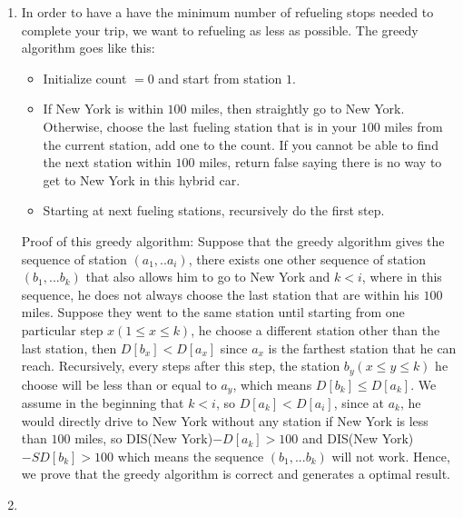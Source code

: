 \documentclass[11pt]{article}
\begin{document}
\begin{solution}
$$  $$
\begin{enumerate}
    \item  
       In order to have a have the minimum number of refueling stops needed to complete your trip, we want to refueling as less as possible. The greedy algorithm goes like this:
       \begin{itemize}
           \item Initialize count $= 0$ and start from station $1$.
           \item If New York is within $100$ miles, then straightly go to New York. Otherwise, choose the last fueling station that is in your $100$ miles from the current station, add one to the count. If you cannot be able to find the next station within $100$ miles, return false saying there is no way to get to New York in this hybrid car.
           \item Starting at next fueling stations, recursively do the first step.
       \end{itemize}
       Proof of this greedy algorithm: Suppose that the greedy algorithm gives the sequence of station $(a_1,..a_i)$, there exists one other sequence of station $(b_1,...b_k)$ that also allows him to go to New York and $k<i$, where in this sequence, he does not always choose the last station that are within his $100$ miles. Suppose they went to the same station until starting from one particular step $x(1\leq x\leq k)$, he choose a different station other than the last station, then $D[b_x] < D[a_x]$ since $a_x$ is the farthest station that he can reach. Recursively, every steps after this step, the station $b_y(x\leq y\leq k)$ he choose will be less than or equal to $a_y$, which means $D[b_k] \leq D[a_k]$. We assume in the beginning that $k<i$, so $D[a_k] < D[a_i]$, since at $a_k$, he would directly drive to New York without any station if New York is less than $100$ miles, so DIS(New York)$ - D[a_k] > 100$ and DIS(New York)$ - SD[b_k] > 100$ which means the sequence $(b_1,...b_k)$ will not work. Hence, we prove that the greedy algorithm is correct and generates a optimal result.
    \item

\end{enumerate}
\end{solution}
\end{document}
